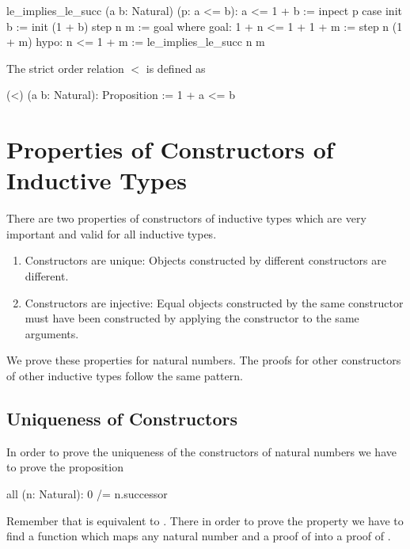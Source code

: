 \begin{alba}
  le_implies_le_succ (a b: Natural) (p: a <= b): a <= 1 + b :=
    inpect p case
      init b :=
        init (1 + b)
      step n m :=
        goal where
          goal: 1 + n <= 1 + 1 + m := step n (1 + m)
          hypo: n <= 1 + m := le_implies_le_succ n m
\end{alba}


The strict order relation $<$ is defined as

\begin{alba}
  (<) (a b: Natural): Proposition :=
    1 + a <= b
\end{alba}






\section{Properties of Constructors of Inductive Types}

There are two properties of constructors of inductive types which are very
important and valid for all inductive types.

\begin{enumerate}

\item Constructors are unique: Objects constructed by
different constructors are different.

\item Constructors are injective: Equal objects constructed by the same
constructor must have been constructed by applying the constructor to the same
arguments.

\end{enumerate}

We prove these properties for natural numbers. The proofs for other constructors
of other inductive types follow the same pattern.




\subsection{Uniqueness of Constructors}

In order to prove the uniqueness of the constructors of natural numbers we have
to prove the proposition

\begin{alba}
    all (n: Natural): 0 /= n.successor
\end{alba}

Remember that  is equivalent to . There in order to prove the property we have to find a function which
maps any natural number  and a proof of  into a
proof of .

